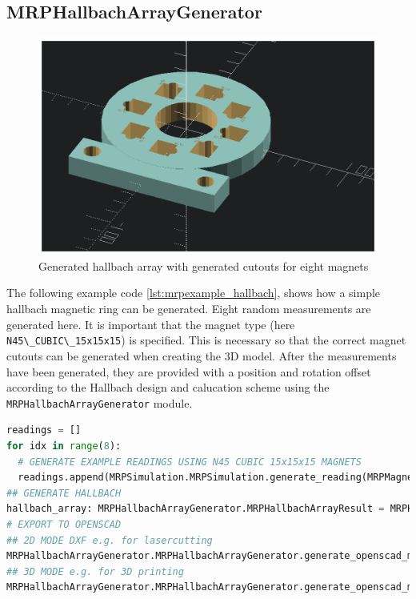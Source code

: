 \hypertarget{mrphallbacharraygenerator}{%
\subsection{MRPHallbachArrayGenerator}\label{mrphallbacharraygenerator}}

\begin{figure}
\centering
\includegraphics{./generated_images/border_Generated_hallbach_array_with_generated_cutouts_for_eight_magnets.png}
\caption{Generated hallbach array with generated cutouts for eight
magnets
\label{Generated_hallbach_array_with_generated_cutouts_for_eight_magnets.png}}
\end{figure}

The following example code \ref{lst:mrpexample_hallbach}, shows how a
simple hallbach magnetic ring can be generated. Eight random
measurements are generated here. It is important that the magnet type
(here \passthrough{\lstinline!N45\_CUBIC\_15x15x15!}) is specified. This
is necessary so that the correct magnet cutouts can be generated when
creating the 3D model. After the measurements have been generated, they
are provided with a position and rotation offset according to the
Hallbach design and calucation
scheme\cite{HallbachMagnetDesignPaper} using the
\passthrough{\lstinline!MRPHallbachArrayGenerator!} module.

\begin{lstlisting}[language=Python, caption={MRPHallbachArrayGenerator example for generating an OpenSCAD based hallbach ring}, label=lst:mrpexample_hallbach]
readings = []
for idx in range(8):
  # GENERATE EXAMPLE READINGS USING N45 CUBIC 15x15x15 MAGNETS
  readings.append(MRPSimulation.MRPSimulation.generate_reading(MRPMagnetTypes.MagnetType.N45_CUBIC_15x15x15))
## GENERATE HALLBACH
hallbach_array: MRPHallbachArrayGenerator.MRPHallbachArrayResult = MRPHallbachArrayGenerator.MRPHallbachArrayGenerator.generate_1k_hallbach_using_polarisation_direction(readings)
# EXPORT TO OPENSCAD
## 2D MODE DXF e.g. for lasercutting
MRPHallbachArrayGenerator.MRPHallbachArrayGenerator.generate_openscad_model([hallbach_array], "./2d_test.scad",_2d_object_code=True)
## 3D MODE e.g. for 3D printing
MRPHallbachArrayGenerator.MRPHallbachArrayGenerator.generate_openscad_model([hallbach_array], "./3d_test.scad",_2d_object_code=False)
\end{lstlisting}

